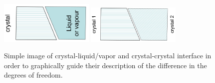 \begin{figure}[b]
    \centering
    \includegraphics[width=0.4\textwidth]{Immagini/Crys-Liqu.png}
    \includegraphics[width=0.4\textwidth]{Immagini/Crys-Crys.png}
    \caption
    {
        Simple image of crystal-liquid/vapor and crystal-crystal interface in order to graphically guide their description of the difference in the degrees of freedom.
    }
    \label{fig:Interfaces}
\end{figure}

